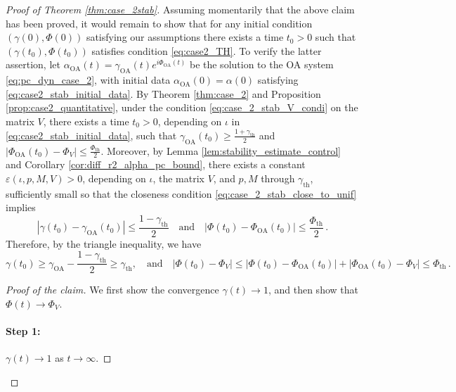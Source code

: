 \documentclass[10pt]{article}
\theoremstyle{definition}
\theoremstyle{definition}
\numberwithin{equation}{section}
\newcommand{\gammaTH}{\gamma_{\mathrm{th}}}
\newcommand{\PhiV}{\Phi_{V}}
\newcommand{\PhiTH}{\Phi_{\mathrm{th}}}
\newcommand{\OA}{\mathrm{OA}}
\begin{document}
\begin{proof}[Proof of Theorem \ref{thm:case_2stab}]
Assuming momentarily that the above claim has been proved, it would remain to show that for any initial condition $(\gamma(0), \Phi(0))$ satisfying our assumptions there exists a time $t_0 > 0$ such that $(\gamma(t_0), \Phi(t_0))$ satisfies condition \eqref{eq:case2_TH}. 
To verify the latter assertion, let $\alpha_{\OA}(t) = \gamma_{\OA}(t) e^{i \Phi_{\OA}(t)}$ be the solution to the OA system \eqref{eq:pc_dyn_case_2}, with initial data $\alpha_{\OA}(0) = \alpha(0)$ satisfying \eqref{eq:case2_stab_initial_data}. By Theorem \ref{thm:case_2} and Proposition \ref{prop:case2_quantitative}, under the condition \eqref{eq:case_2_stab_V_condi} on the matrix $V$, there exists a time $t_0 > 0$, depending on $\iota$ in \eqref{eq:case2_stab_initial_data}, such that $\gamma_{\OA}(t_0) \geq \frac{1 + \gammaTH}{2}$ and $|\Phi_{\OA}(t_0) - \PhiV| \leq \frac{\PhiTH}{2}$. 
Moreover, by Lemma \ref{lem:stability_estimate_control} and Corollary \ref{cor:diff_r2_alpha_pc_bound}, there exists a constant $\varepsilon(\iota, p, M, V) > 0$, depending on $\iota$, the matrix $V$, and $p, M$ through $\gammaTH$, sufficiently small so that the closeness condition \eqref{eq:case_2_stab_close_to_unif} implies
\begin{equation*}
|\gamma(t_0) - \gamma_{\OA}(t_0)| \leq \frac{1 - \gammaTH}{2} \quad \text{and} \quad |\Phi(t_0) - \Phi_{\OA}(t_0)| \leq \frac{\PhiTH}{2} \, .
\end{equation*}
Therefore, by the triangle inequality, we have  
\begin{equation*}
\gamma(t_0) \geq \gamma_{\OA} - \frac{1 - \gammaTH}{2} \geq \gammaTH, \quad \text{and} \quad |\Phi(t_0) - \PhiV| \leq |\Phi(t_0) - \Phi_{\OA}(t_0)| + |\Phi_{\OA}(t_0) - \PhiV| \leq \PhiTH \, .
\end{equation*}


\begin{proof}[Proof of the claim]
We first show the convergence $\gamma(t) \rightarrow 1$, and then show that $\Phi(t) \rightarrow \PhiV$.

\paragraph{Step 1:} $\gamma(t) \rightarrow 1$ as $t \rightarrow \infty$.


\end{proof}
\end{proof}
\end{document}
